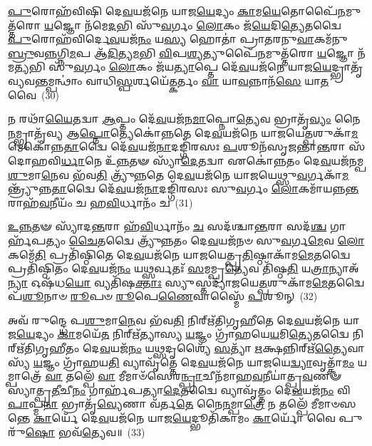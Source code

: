 {\anuvakamend[{\-\ul{𑌏}\-𑌤𑌦𑍍𑌵𑍈 \ul{𑌕𑍍𑌰𑍂}\-𑌰 \ul{𑌇}\-𑌵𑍈𑌕᳴𑌵𑍍𑌰𑌤𑌾 \ul{𑌆}\-𑌤𑍍𑌮\-\ul{𑌨𑌾} 𑌯𑌜᳴𑌮𑌾𑌨\-\ul{𑌸𑍍𑌯} 𑌤𑍍𑌰𑌯𑍋᳴𑌦𑌶 𑌚}]}%

\-\ul{𑌪𑍁}\-𑌰𑍋𑌹᳴𑌵𑌿𑌷𑌿 𑌦𑍇\-\ul{𑌵}\-𑌯𑌜᳴𑌨𑍇 𑌯𑌾𑌜\-\ul{𑌯𑍇}\-𑌦𑍍𑌯𑌂 \ul{𑌕𑌾}\-𑌮\-\ul{𑌯𑍇}\-𑌤𑍋𑌪𑍈᳴\-\ul{𑌨}\-𑌮𑍁𑌤𑍍𑌤᳴𑌰𑍋 \ul{𑌯}\-𑌜𑍍𑌞𑍋 𑌨᳴𑌮𑍇\-\ul{𑌦}\-𑌭𑌿 𑌸𑍁᳴\-\ul{𑌵}\-𑌰𑍍𑌗𑌂 \ul{𑌲𑍋}\-𑌕𑌂 𑌜᳴\-\ul{𑌯𑍇}\-𑌦𑌿\-\ul{𑌤𑍍𑌯𑍇}\-𑌤𑌦𑍍𑌵𑍈 \ul{𑌪𑍁}\-𑌰𑍋𑌹᳴𑌵𑌿𑌰𑍍𑌦𑍇\-\ul{𑌵}\-𑌯𑌜᳴\-\ul{𑌨𑌂} 𑌯\-\ul{𑌸𑍍𑌯} 𑌹𑍋𑌤𑌾॑ 𑌪𑍍𑌰𑌾𑌤𑌰𑌨𑍁\-\ul{𑌵𑌾}\-𑌕𑌮᳴𑌨𑍁\-\ul{𑌬𑍍𑌰𑍁}\-𑌵\-\ul{𑌨𑍍𑌨}\-𑌗𑍍𑌨𑌿\-\ul{𑌮}\-𑌪 𑌆᳴\-\ul{𑌦𑌿}\-𑌤𑍍𑌯\-\ul{𑌮}\-𑌭𑌿 \ul{𑌵𑌿}\-𑌪\-\ul{𑌶𑍍𑌯}\-𑌤𑍍𑌯𑍁𑌪𑍈᳴\-\ul{𑌨}\-𑌮𑍁𑌤𑍍𑌤᳴𑌰𑍋 \ul{𑌯}\-𑌜𑍍𑌞𑍋 𑌨᳴𑌮\-\ul{𑌤𑍍𑌯}\-𑌭𑌿 𑌸𑍁᳴\-\ul{𑌵}\-𑌰𑍍𑌗𑌂 \ul{𑌲𑍋}\-𑌕𑌂 𑌜᳴𑌯\-\ul{𑌤𑍍𑌯𑌾}\-𑌪𑍍𑌤𑍇 𑌦𑍇᳴\-\ul{𑌵}\-𑌯𑌜᳴𑌨𑍇 𑌯𑌾𑌜\-\ul{𑌯𑍇}\-𑌦𑍍𑌭𑍍𑌰𑌾𑌤𑍃᳴𑌵𑍍𑌯𑌵\-\ul{𑌨𑍍𑌤}\-𑌮𑍍𑌪𑌨𑍍𑌥𑌾𑌂॑ 𑌵𑌾𑌧𑌿\-\ul{𑌸𑍍𑌪}\-𑌰𑍍\mbox{}𑌶𑌯𑍇᳴\-\ul{𑌤𑍍𑌕}\-𑌰𑍍𑌤𑌂 \ul{𑌵𑌾} 𑌯𑌾\-\ul{𑌵}\-𑌨𑍍𑌨𑌾𑌨᳴\-\ul{𑌸𑍇} 𑌯𑌾\-\ul{𑌤}\-𑌵𑍈~(30)

𑌨 𑌰𑌥𑌾᳴\-\ul{𑌯𑍈}\-𑌤𑌦𑍍𑌵𑌾 \ul{𑌆}\-𑌪𑍍𑌤𑌂 𑌦𑍇᳴\-\ul{𑌵}\-𑌯𑌜᳴𑌨\-\ul{𑌮𑌾}\-𑌪𑍍𑌨𑍋\-\ul{𑌤𑍍𑌯𑍇}\-𑌵 𑌭𑍍𑌰𑌾𑌤𑍃᳴\-\ul{𑌵𑍍𑌯𑌂} 𑌨𑍈\-\ul{𑌨}\-𑌮𑍍𑌭𑍍𑌰𑌾𑌤𑍃᳴𑌵𑍍𑌯 𑌆\-\ul{𑌪𑍍𑌨𑍋}\-𑌤𑍍𑌯𑍇𑌕𑍋॑𑌨𑍍𑌨𑌤𑍇 𑌦𑍇\-\ul{𑌵}\-𑌯𑌜᳴𑌨𑍇 𑌯𑌾𑌜𑌯𑍇\-\ul{𑌤𑍍𑌪}\-𑌶𑍁𑌕𑌾᳴\-\ul{𑌮}\-𑌮𑍇𑌕𑍋॑𑌨𑍍𑌨\-\ul{𑌤𑌾}\-𑌦𑍍𑌵𑍈 𑌦𑍇᳴\-\ul{𑌵}\-𑌯𑌜᳴\-\ul{𑌨𑌾}\-𑌦𑌙𑍍𑌗𑌿᳴𑌰𑌸𑌃 \ul{𑌪}\-𑌶𑍂𑌨᳴𑌸𑍃𑌜𑌨𑍍𑌤𑌾\-\ul{𑌨𑍍𑌤}\-𑌰𑌾 𑌸᳴𑌦𑍋𑌹𑌵𑌿\-\ul{𑌰𑍍𑌧𑌾}\-𑌨𑍇 𑌉᳴\-\ul{𑌨𑍍𑌨}\-𑌤𑍟 𑌸𑍍𑌯𑌾᳴\-\ul{𑌦𑍇}\-𑌤𑌦𑍍𑌵𑌾 𑌏𑌕𑍋॑𑌨𑍍𑌨𑌤𑌂 𑌦𑍇\-\ul{𑌵}\-𑌯𑌜᳴𑌨𑌮𑍍𑌪\-\ul{𑌶𑍁}\-𑌮𑌾\-\ul{𑌨𑍇}\-𑌵 𑌭᳴𑌵\-\ul{𑌤𑌿} 𑌤𑍍𑌰𑍍𑌯𑍁᳴𑌨𑍍𑌨𑌤𑍇 𑌦𑍇\-\ul{𑌵}\-𑌯𑌜᳴𑌨𑍇 𑌯𑌾𑌜𑌯𑍇𑌥𑍍𑌸𑍁\-\ul{𑌵}\-𑌰𑍍𑌗𑌕𑌾᳴\-\ul{𑌮}\-𑌨𑍍𑌤𑍍𑌰𑍍𑌯𑍁᳴𑌨𑍍𑌨\-\ul{𑌤𑌾}\-𑌦𑍍𑌵𑍈 𑌦𑍇᳴\-\ul{𑌵}\-𑌯𑌜᳴\-\ul{𑌨𑌾}\-𑌦𑌙𑍍𑌗𑌿᳴𑌰𑌸𑌃 𑌸𑍁\-\ul{𑌵}\-𑌰𑍍𑌗𑌂 \ul{𑌲𑍋}\-𑌕𑌮𑌾᳴𑌯𑌨𑍍𑌨\-\ul{𑌨𑍍𑌤}\-𑌰𑌾𑌹᳴\-\ul{𑌵}\-𑌨𑍀𑌯𑌂᳴ 𑌚 𑌹\-\ul{𑌵𑌿}\-𑌰𑍍𑌧𑌾𑌨𑌂᳴ 𑌚~(31)

\-\ul{𑌉}\-\-\ul{𑌨𑍍𑌨}\-𑌤𑍟 𑌸𑍍𑌯𑌾᳴𑌦\-\ul{𑌨𑍍𑌤}\-𑌰𑌾 𑌹᳴\-\ul{𑌵𑌿}\-𑌰𑍍𑌧𑌾𑌨𑌂᳴ \ul{𑌚} 𑌸𑌦᳴𑌶𑍍𑌚𑌾\-\ul{𑌨𑍍𑌤}\-𑌰𑌾 𑌸𑌦᳴\-\ul{𑌶𑍍𑌚} 𑌗𑌾𑌰𑍍\mbox{}𑌹᳴𑌪𑌤𑍍𑌯𑌂 \ul{𑌚𑍈}\-𑌤𑌦𑍍𑌵𑍈 𑌤𑍍𑌰𑍍𑌯𑍁᳴𑌨𑍍𑌨𑌤𑌂 𑌦𑍇\-\ul{𑌵}\-𑌯𑌜᳴𑌨𑍞 𑌸𑍁\-\ul{𑌵}\-𑌰𑍍𑌗\-\ul{𑌮𑍇}\-𑌵 \ul{𑌲𑍋}\-𑌕𑌮𑍇᳴\-\ul{𑌤𑌿} 𑌪𑍍𑌰𑌤𑌿᳴𑌷𑍍𑌠𑌿𑌤𑍇 𑌦𑍇\-\ul{𑌵}\-𑌯𑌜᳴𑌨𑍇 𑌯𑌾𑌜𑌯𑍇𑌤𑍍𑌪𑍍𑌰\-\ul{𑌤𑌿}\-𑌷𑍍𑌠𑌾𑌕𑌾᳴𑌮\-\ul{𑌮𑍇}\-𑌤𑌦𑍍𑌵𑍈 𑌪𑍍𑌰𑌤𑌿᳴𑌷𑍍𑌠𑌿𑌤𑌂 𑌦𑍇\-\ul{𑌵}\-𑌯𑌜᳴\-\ul{𑌨𑌂} 𑌯\-\ul{𑌥𑍍𑌸}\-𑌰𑍍𑌵𑌤𑌃᳴ \ul{𑌸}\-𑌮𑌮𑍍𑌪𑍍𑌰\-\ul{𑌤𑍍𑌯𑍇}\-𑌵 𑌤𑌿᳴𑌷𑍍𑌠\-\ul{𑌤𑌿} 𑌯\-\ul{𑌤𑍍𑌰𑌾}\-𑌨𑍍𑌯𑌾𑌅᳴\-\ul{𑌨𑍍𑌯𑌾} 𑌓𑌷᳴𑌧\-\ul{𑌯𑍋} 𑌵𑍍𑌯𑌤𑌿᳴𑌷\-\ul{𑌕𑍍𑌤𑌾𑌃} 𑌸𑍍𑌯𑍁𑌸𑍍𑌤𑌦𑍍𑌯𑌾᳴𑌜𑌯𑍇\-\ul{𑌤𑍍𑌪}\-𑌶𑍁𑌕𑌾᳴𑌮\-\ul{𑌮𑍇}\-𑌤𑌦𑍍𑌵𑍈 𑌪᳴\-\ul{𑌶𑍂}\-𑌨𑌾𑍞 \ul{𑌰𑍂}\-𑌪𑍞 \ul{𑌰𑍂}\-𑌪𑍇\-\ul{𑌣𑍈}\-𑌵𑌾𑌸𑍍𑌮𑍈᳴ \ul{𑌪}\-𑌶𑍂𑌨𑍍~(32)

𑌅𑌵᳴ 𑌰𑍁𑌨𑍍𑌦𑍍𑌧𑍇 𑌪\-\ul{𑌶𑍁}\-𑌮𑌾\-\ul{𑌨𑍇}\-𑌵 𑌭᳴𑌵\-\ul{𑌤𑌿} 𑌨𑌿𑌰𑍍\mbox{}𑌋᳴𑌤𑌿𑌗𑍃𑌹𑍀𑌤𑍇 𑌦𑍇\-\ul{𑌵}\-𑌯𑌜᳴𑌨𑍇 𑌯𑌾𑌜\-\ul{𑌯𑍇}\-𑌦𑍍𑌯𑌂 \ul{𑌕𑌾}\-𑌮𑌯𑍇᳴\-\ul{𑌤} 𑌨𑌿𑌰𑍍\mbox{}𑌋᳴𑌤𑍍𑌯𑌾𑌸𑍍𑌯 \ul{𑌯}\-𑌜𑍍𑌞𑌂 𑌗𑍍𑌰𑌾᳴𑌹𑌯𑍇\-\ul{𑌯}\-𑌮𑌿\-\ul{𑌤𑍍𑌯𑍇}\-𑌤𑌦𑍍𑌵𑍈 𑌨𑌿𑌰𑍍\mbox{}𑌋᳴𑌤𑌿𑌗𑍃𑌹𑍀𑌤𑌂 𑌦𑍇\-\ul{𑌵}\-𑌯𑌜᳴\-\ul{𑌨𑌂} 𑌯\-\ul{𑌥𑍍𑌸}\-𑌦𑍃𑌶𑍍𑌯𑍈᳴ \ul{𑌸}\-𑌤𑍍𑌯𑌾᳴ \ul{𑌋}\-𑌕𑍍𑌷𑌨𑍍𑌨𑌿𑌰𑍍\mbox{}𑌋᳴\-\ul{𑌤𑍍𑌯𑍈}\-𑌵𑌾𑌸𑍍𑌯᳴ \ul{𑌯}\-𑌜𑍍𑌞𑌂 𑌗𑍍𑌰𑌾᳴𑌹𑌯\-\ul{𑌤𑌿} 𑌵𑍍𑌯𑌾𑌵𑍃᳴𑌤𑍍𑌤𑍇 𑌦𑍇\-\ul{𑌵}\-𑌯𑌜᳴𑌨𑍇 𑌯𑌾𑌜𑌯𑍇\-\ul{𑌦𑍍𑌵𑍍𑌯𑌾}\-𑌵𑍃𑌤𑍍𑌕𑌾᳴\-\ul{𑌮𑌂} 𑌯𑌮𑍍𑌪𑌾𑌤𑍍𑌰𑍇᳴ \ul{𑌵𑌾} 𑌤𑌲𑍍𑌪𑍇᳴ \ul{𑌵𑌾} 𑌮𑍀𑌮𑌾𑍞᳴𑌸𑍇𑌰\-\ul{𑌨𑍍𑌪𑍍𑌰𑌾}\-𑌚𑍀𑌨᳴𑌮𑌾𑌹\-\ul{𑌵}\-𑌨𑍀𑌯𑌾॑𑌤𑍍𑌪𑍍𑌰\-\ul{𑌵}\-𑌣𑍟 𑌸𑍍𑌯𑌾॑𑌤𑍍𑌪𑍍𑌰\-\ul{𑌤𑍀}\-𑌚𑍀\-\ul{𑌨𑌂} 𑌗𑌾𑌰𑍍\mbox{}𑌹᳴𑌪𑌤𑍍𑌯𑌾\-\ul{𑌦𑍇}\-𑌤𑌦𑍍𑌵𑍈 𑌵𑍍𑌯𑌾𑌵𑍃᳴𑌤𑍍𑌤𑌂 𑌦𑍇\-\ul{𑌵}\-𑌯𑌜᳴\-\ul{𑌨𑌂} 𑌵𑌿 \ul{𑌪𑌾}\-𑌪𑍍𑌮\-\ul{𑌨𑌾} 𑌭𑍍𑌰𑌾𑌤𑍃᳴\-\ul{𑌵𑍍𑌯𑍇}\-𑌣𑌾 𑌵᳴𑌰𑍍𑌤\-\ul{𑌤𑍇} 𑌨𑍈\-\ul{𑌨}\-𑌮𑍍𑌪𑌾\-\ul{𑌤𑍍𑌰𑍇} 𑌨 𑌤𑌲𑍍𑌪𑍇᳴ 𑌮𑍀𑌮𑌾𑍞𑌸𑌨𑍍𑌤𑍇 \ul{𑌕𑌾}\-𑌰𑍍𑌯𑍇᳴ 𑌦𑍇\-\ul{𑌵}\-𑌯𑌜᳴𑌨𑍇 𑌯𑌾𑌜\-\ul{𑌯𑍇}\-𑌦𑍍𑌭𑍂𑌤𑌿᳴𑌕𑌾𑌮𑌂 \ul{𑌕𑌾}\-𑌰𑍍𑌯𑍋᳴ 𑌵𑍈 𑌪𑍁𑌰𑍁᳴\-\ul{𑌷𑍋} 𑌭𑌵᳴\-\ul{𑌤𑍍𑌯𑍇}\-𑌵॥~(33)

